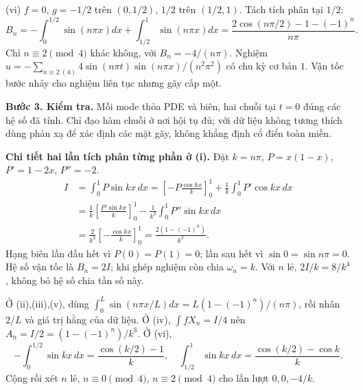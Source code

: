 \documentclass[10pt,a4paper]{article}
\begin{document}
(vi) $f=0$, $g=-1/2$ trên $(0,1/2)$, $1/2$ trên $(1/2,1)$. Tách tích phân tại $1/2$:
\[B_n=-\int_0^{1/2}\sin(n\pi x)dx+\int_{1/2}^1\sin(n\pi x)dx
=\frac{2\cos(n\pi/2)-1-(-1)^n}{n\pi}.\]
Chỉ $n\equiv2\pmod4$ khác không, với $B_n=-4/(n\pi)$. Nghiệm $u=-\sum_{n\equiv2\ (4)}4\sin(n\pi t)\sin(n\pi x)/(n^2\pi^2)$ có chu kỳ cơ bản $1$. Vận tốc bước nhảy cho nghiệm liên tục nhưng gãy cấp một.

\textbf{Bước 3. Kiểm tra.} Mỗi mode thỏa PDE và biên, hai chuỗi tại $t=0$ đúng các hệ số đã tính. Chỉ đạo hàm chuỗi ở nơi hội tụ đủ; với dữ liệu không tương thích dùng phản xạ để xác định các mặt gãy, không khẳng định cổ điển toàn miền.

\textbf{Chi tiết hai lần tích phân từng phần ở (i).} Đặt $k=n\pi$, $P=x(1-x)$, $P'=1-2x$, $P''=-2$.
\[\begin{aligned}
I&=\int_0^1P\sin kx\,dx
=\left[-P\frac{\cos kx}{k}\right]_0^1+\frac1k\int_0^1P'\cos kx\,dx\\
&=\frac1k\left[\frac{P'\sin kx}{k}\right]_0^1-\frac1{k^2}\int_0^1P''\sin kx\,dx\\
&=\frac2{k^2}\left[-\frac{\cos kx}{k}\right]_0^1=\frac{2(1-(-1)^n)}{k^3}.
\end{aligned}\]
Hạng biên lần đầu hết vì $P(0)=P(1)=0$; lần sau hết vì $\sin0=\sin n\pi=0$. Hệ số vận tốc là $B_n=2I$; khi ghép nghiệm còn chia $\omega_n=k$. Với $n$ lẻ, $2I/k=8/k^4$, không bỏ hệ số chia tần số này.

Ở (ii),(iii),(v), dùng $\int_0^L\sin(n\pi x/L)dx=L(1-(-1)^n)/(n\pi)$, rồi nhân $2/L$ và giá trị hằng của dữ liệu. Ở (iv), $\int fX_n=I/4$ nên $A_n=I/2=(1-(-1)^n)/k^3$. Ở (vi),
\[-\int_0^{1/2}\sin kx\,dx=\frac{\cos(k/2)-1}{k},\quad
\int_{1/2}^1\sin kx\,dx=\frac{\cos(k/2)-\cos k}{k}.\]
Cộng rồi xét $n$ lẻ, $n\equiv0\pmod4$, $n\equiv2\pmod4$ cho lần lượt $0,0,-4/k$.
\end{document}
